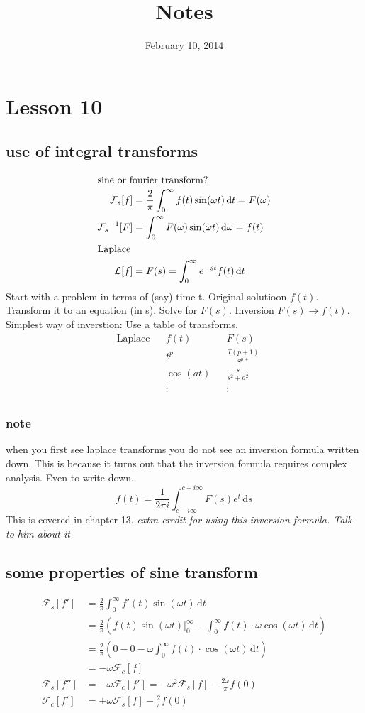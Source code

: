 \documentclass{article}
\begin{document}
\title{Notes}
\date{February 10, 2014}
\maketitle
\section*{Lesson 10}
\subsection*{use of integral transforms}
\begin{align*}
  \intertext{sine or fourier transform?}
  \mathcal{F}_s[f]&=\frac{2}{\pi}\int_0^\infty{f(t)\sin(\omega t)\,\mathrm{d}t}=F(\omega)\\
  {\mathcal{F}_s}^{-1}[F]&=\int_0^\infty{F(\omega)\sin(\omega t)\,\mathrm{d}\omega}=f(t)\\
  \intertext{Laplace}
  \mathcal{L}[f]&=F(s)=\int_0^\infty{e^{-st}f(t)\,\mathrm{d}t}
\end{align*}
Start with a problem in terms of (say) time t. Original solutioon $f(t)$. Transform it to an equation (in s). Solve for $F(s)$. Inversion $F(s)\to f(t)$. Simplest way of inverstion: Use a table of transforms.
\begin{align*}
  &\text{Laplace}&&f(t)&&F(s)\\
  &&&t^p&&\frac{T(p+1)}{S^{p+}}\\
  &&&\cos(at)&&\frac{s}{s^2+a^2}\\
  &&&\vdots&&\vdots\\
\end{align*}
\subsubsection*{note}
when you first see laplace transforms you do not see an inversion formula written down. This is because it turns out that the inversion formula requires complex analysis. Even to write down.
\[f(t)=\frac{1}{2\pi i}\int_{c-i\infty}^{c+i\infty}{F(s)e^t\,\mathrm{d}s}\]
This is covered in chapter 13.
\emph{extra credit for using this inversion formula. Talk to him about it}
\subsection*{some properties of sine transform}
\begin{align*}
  \mathcal{F}_s[f']&=\frac{2}{\pi}\int_0^\infty{f'(t)\sin(\omega t)\,\mathrm{d}t}\\
  &=\frac{2}{\pi}\left(\left.f(t)\sin(\omega t)\right|_0^\infty-\int_0^\infty{f(t)\cdot \omega\cos(\omega t)\,\mathrm{d}t}\right)\\
  &=\frac{2}{\pi}\left(0-0-\omega\int_0^\infty{f(t)\cdot \cos(\omega t)\,\mathrm{d}t}\right)\\
  &=-\omega\mathcal{F}_c[f]\\
  \mathcal{F}_s[f'']&=-\omega\mathcal{F}_c[f']=-\omega^2\mathcal{F}_s[f]-\frac{2\omega}{\pi}f(0)\\
  \mathcal{F}_c[f']&=+\omega\mathcal{F}_s[f]-\frac{2}{\pi}f(0)
\end{align*}
\end{document}
